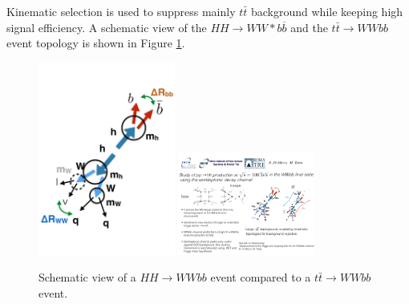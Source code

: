 Kinematic selection is used to suppress mainly $t\bar{t}$ background while keeping
high signal efficiency.  A schematic view of the $HH \to WW{*}b\overline{b}$ and the
$t \bar{t} \to WWbb$ event topology is shown in Figure \ref{fig:cartoon}.
\begin{figure}
\includegraphics[width=0.4\textwidth]{figures/cartoon_hh.pdf}
\includegraphics[width=0.4\textwidth]{figures/cartoon_tt.pdf}
\caption[Comparison signal and \ttbar events]{Schematic view of a $HH \to WWbb$ event compared to a $t\bar{t} \to WWbb$ event.} 
\label{fig:cartoon}
\end{figure}

